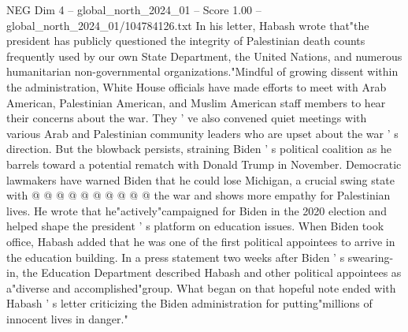 \begin{textsample}{NEG Dim 4 – global\_north\_2024\_01 – Score 1.00 – global\_north\_2024\_01/104784126.txt}
In his letter, Habash wrote that"the president has publicly questioned the integrity of Palestinian death counts frequently used by our own State Department, the United Nations, and numerous humanitarian non-governmental organizations."Mindful of growing dissent within the administration, White House officials have made efforts to meet with Arab American, Palestinian American, and Muslim American staff members to hear their concerns about the war.
They ' ve also convened quiet meetings with various Arab and Palestinian community leaders who are upset about the war ' s direction.
But the blowback persists, straining Biden ' s political coalition as he barrels toward a potential rematch with Donald Trump in November.
Democratic lawmakers have warned Biden that he could lose Michigan, a crucial swing state with @ @ @ @ @ @ @ @ @ @ the war and shows more empathy for Palestinian lives.
He wrote that he"actively"campaigned for Biden in the 2020 election and helped shape the president ' s platform on education issues.
When Biden took office, Habash added that he was one of the first political appointees to arrive in the education building.
In a press statement two weeks after Biden ' s swearing-in, the Education Department described Habash and other political appointees as a"diverse and accomplished"group.
What began on that hopeful note ended with Habash ' s letter criticizing the Biden administration for putting"millions of innocent lives in danger."

\end{textsample}
